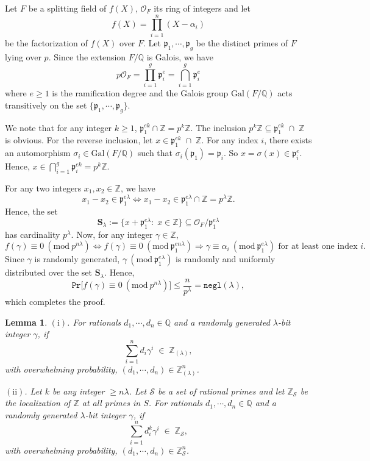 \documentclass[11pt, lettersize, notitlepage, leqno, footskip=0.6cm]{article}
\newcommand{\bz}{\mathbb Z}
\newcommand{\bq}{\mathbb Q}
\newcommand{\pl}{\prod\limits}
\newcommand{\ttt}{\texttt}
\newcommand{\Gal}{\mathrm{Gal}}
\newcommand{\negl}{\ttt{{negl}}}
\newcommand{\LRA}{\Longleftrightarrow}
\newcommand{\mc}{\mathcal}
\newcommand{\mbf}{\mathbf}
\newcommand{\mr}{\mathrm}
\newcommand{\mfp}{\mathfrak{p}}
\newcommand{\al}{\alpha}
\newcommand{\lam}{\lambda}
\newcommand{\bzlam}{\bz_{(\lam)}}
\newcommand{\sub}{\subseteq}
\newcommand{\vs}{\vspace{-0.15cm}}
\newcommand{\noin}{\noindent}
\newcommand{\op}{overwhelming probability}
\newcommand{\Mod}[1]{\ (\mathrm{mod}\ #1)}
\newtheorem{Lem}[Thm]{Lemma}
\numberwithin{equation}{section}
\begin{document}
\begin{prf} Let $F$ be a splitting field of $f(X)$, $\mc{O}_F$ its ring of integers and let \vs $${f}(X) = \pl_{i=1}^n (X-\al_i)$$ be the factorization of ${f}(X)$ over $F$. Let $\mfp_{1},\cdots,\mfp_g$ be the distinct primes of $F$ lying over $p$. Since the extension $F/\bq$ is Galois, we have \vs $$p\mc{O}_F = \pl_{i=1}^{g} \mfp_i^e = \bigcap\limits_{i=1}^{g} \mfp_i^e$$ where $e\geq 1$ is the ramification degree and the Galois group $\Gal(F/\bq)$ acts transitively on the set $\{ \mfp_1,\cdots,\mfp_g\}$.

We note that for any integer $k\geq 1$, $\mfp_1^{ek}\cap \bz = p^{k}\bz$. The inclusion $p^{k}\bz\sub \mfp_1^{ek}\;\cap \;\bz$ is obvious. For the reverse inclusion, let $x\in \mfp_1^{ek}\;\cap\; \bz$. For any index $i$, there exists an automorphism $\sigma_i\in \Gal(F/\bq)$ such that $\sigma_i(\mfp_1) = \mfp_i$. So $x = \sigma(x) \in \mfp_i^e$. Hence, $x\in \bigcap\limits_{i=1}^g \mfp_i^{ek} = p^{k}\bz$.

\noin For any two integers $x_1,x_2\in \bz$, we have \vs $$x_1-x_2\in \mfp_1^{e\lam}\LRA x_1-x_2\in \mfp_1^{e\lam}\cap \bz = p^{\lam}\bz.$$ Hence, the set \vs $$ \mbf{S}_{\lam}:= \{x + {\mfp_1^{e\lam}}:\;x\in\bz \}\sub \mc{O}_F/\mfp_1^{e\lam} $$ has cardinality $p^{\lam}$. Now, for any integer $\gamma\in \bz$, \vs $$f(\gamma)\equiv 0 \Mod{p^{n\lam}} \LRA f(\gamma)\equiv 0 \Mod{\mfp_1^{en\lam}}  \Longrightarrow \gamma\equiv \al_i \Mod{\mfp_1^{e\lam}}\text{ for at least one index } i. $$  Since $\gamma$ is randomly generated, $\gamma\Mod{\mfp_1^{e\lam}}$ is randomly and uniformly distributed over the set $\mbf{S}_{\lam}$. Hence, \vs $$ \ttt{Pr}\big[ f(\gamma)\equiv 0 \Mod{p^{n\lam}} \big]\leq \frac{n}{p^{\lam}} = \negl(\lam),$$ which completes the proof.\end{prf}

\vspace{0.15cm}

\begin{Lem} \label{integers} $\mr{(i)}$. For rationals $d_1,\cdots, d_n\in \bq$ and a randomly generated $\lam$-bit integer $\gamma$, if \vs $$\sum_{i=1}^n d_i\gamma^i\; \in \;\bzlam,$$ with \op, $(d_1,\cdots, d_n)\in \bzlam^n$.\vspace{0.1cm}

\noin $\mr{(ii)}$. Let $k$ be any integer $\geq n\lam$. Let $\mc{S}$ be a set of rational primes and let $\bz_{\mc{S}}$ be the localization of $\bz$ at all primes in $S$. For rationals $d_1,\cdots, d_n\in \bq$ and a randomly generated $\lam$-bit integer $\gamma$, if \vs $$\sum_{i=1}^n d_i^{k}\gamma^i\; \in \;\bz_{\mc{S}},$$ with \op, $(d_1,\cdots, d_n)\in \bz_{\mc{S}}^n$.
\end{Lem}
\end{document}
